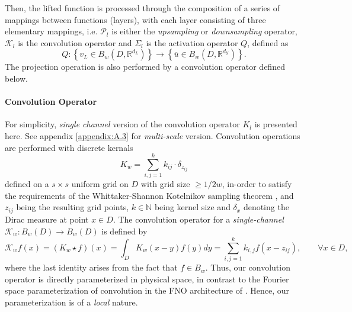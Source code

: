 \documentclass[reqno,10pt]{amsart}
\theoremstyle{plain}
\theoremstyle{definition}
\newcommand{\bb}[1]{\mathbb{#1}}
\newcommand{\cal}[1]{\mathcal{#1}}
\begin{document}
    \noindent Then, the lifted function is processed through the composition of a series of mappings between functions (layers), with each layer consisting of three elementary mappings, i.e. $\cal P_l$ is either the {\it upsampling} or {\it downsampling} operator, $\cal K_l$ is the convolution operator and $\Sigma_l$ is the activation operator $Q$, defined as 
    $$ Q : \left\{v_L \in B_w(D,\bb R^{d_L}) \right\} \to \left\{\overline{u} \in B_w(D,\bb R^{d_{\cal Y}}) \right\}.$$
    The projection operation is also performed by a convolution operator defined below.

    \paragraph{\bf Convolution Operator} For simplicity, {\it single channel} version of the convolution operator $K_l$ is presented here. See appendix \ref{appendix:A.3} for {\it multi-scale} version. Convolution operations are performed with discrete kernals
    $$ K_w = \sum_{i,j=1}^{k} k_{ij} \cdot \delta_{z_{ij}}$$
    defined on a $s \times s$ uniform grid on $D$ with grid size $\geq 1/2w$, in-order to satisfy the requirements of the Whittaker-Shannon Kotelnikov sampling theorem \cite{MU2000}, and $z_{ij}$ being the resulting grid points, $k \in\bb N$ being kernel size and $\delta_x$ denoting the Dirac measure at point $x\in D$. The convolution operator for a {\it single-channel} $\cal K_w : B_w(D) \to B_w(D)$ is defined by 
    $$ \cal K_wf(x) = (K_w \star f)(x) = \int_D K_w(x-y)f(y) dy = \sum_{i,j=1}^{k} k_{i,j} f(x-z_{ij}), \qquad \forall x\in D,$$
    where the last identity arises from the fact that $f \in B_w$. Thus, our convolution operator is directly parameterized in physical space, in contrast to the Fourier space parameterization of convolution in the FNO architecture of \cite{ZL2021}. Hence, our parameterization is of a {\it local} nature.
\end{document}
